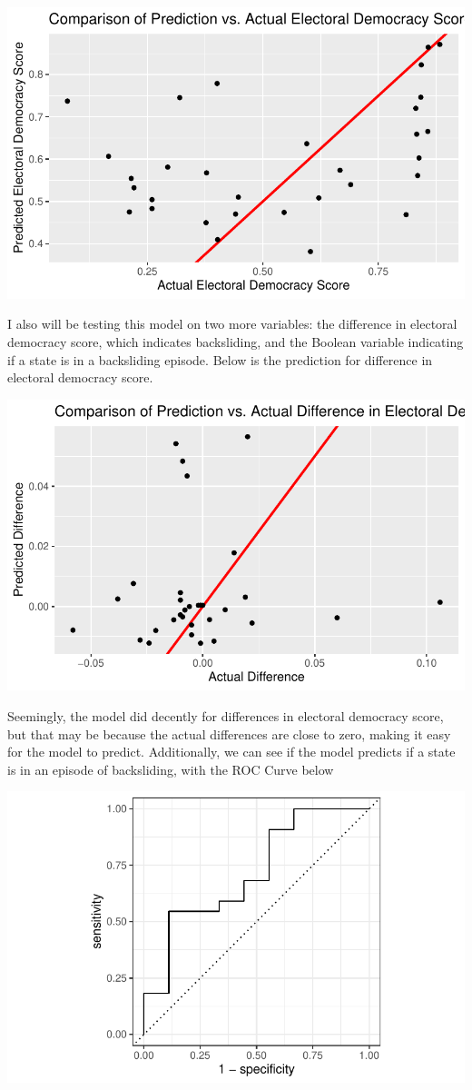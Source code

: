 \documentclass[
  letterpaper,
  DIV=11,
  numbers=noendperiod]{scrartcl}
\begin{document}
\includegraphics{Episode_2_files/figure-pdf/fulldata-1.pdf}

I also will be testing this model on two more variables: the difference
in electoral democracy score, which indicates backsliding, and the
Boolean variable indicating if a state is in a backsliding episode.
Below is the prediction for difference in electoral democracy score.

\includegraphics{Episode_2_files/figure-pdf/diffpolyarchy-1.pdf}

Seemingly, the model did decently for differences in electoral democracy
score, but that may be because the actual differences are close to zero,
making it easy for the model to predict. Additionally, we can see if the
model predicts if a state is in an episode of backsliding, with the ROC
Curve below

\includegraphics{Episode_2_files/figure-pdf/backslided-1.pdf}
\end{document}
